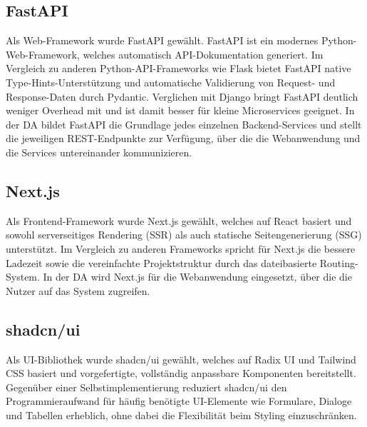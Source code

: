 \subsection{FastAPI}

Als Web-Framework wurde FastAPI gewählt. FastAPI ist ein modernes Python-Web-Framework,
welches automatisch \gls{API}-Dokumentation generiert.\cite{fastapi}
Im Vergleich zu anderen Python-\gls{API}-Frameworks wie Flask bietet FastAPI native Type-Hints-Unterstützung 
und automatische Validierung von Request- und Response-Daten durch 
Pydantic.\cite{jetbrains_frameworks}
Verglichen mit Django bringt FastAPI deutlich weniger Overhead mit und ist 
damit besser für kleine Microservices geeignet.\cite{jetbrains_frameworks}
In der \gls{DA} bildet FastAPI die Grundlage jedes einzelnen 
Backend-Services und stellt die jeweiligen REST-Endpunkte zur Verfügung, 
über die die Webanwendung und die Services untereinander kommunizieren.

\subsection{Next.js}

Als Frontend-Framework wurde Next.js gewählt, welches auf React basiert 
und sowohl serverseitiges Rendering (SSR) als auch statische 
Seitengenerierung (SSG) unterstützt.\cite{nextjs}
Im Vergleich zu anderen Frameworks spricht für Next.js die bessere Ladezeit sowie
die vereinfachte Projektstruktur durch das dateibasierte Routing-System.
In der \gls{DA} wird Next.js für die Webanwendung eingesetzt, 
über die die Nutzer auf das System zugreifen.

\subsection{shadcn/ui}

Als UI-Bibliothek wurde shadcn/ui gewählt, welches auf 
Radix UI und Tailwind CSS basiert und vorgefertigte, vollständig 
anpassbare Komponenten bereitstellt.\cite{shadcn}
Gegenüber einer Selbstimplementierung reduziert shadcn/ui den Programmieraufwand
für häufig benötigte UI-Elemente wie Formulare, Dialoge und Tabellen 
erheblich, ohne dabei die Flexibilität beim Styling einzuschränken.
